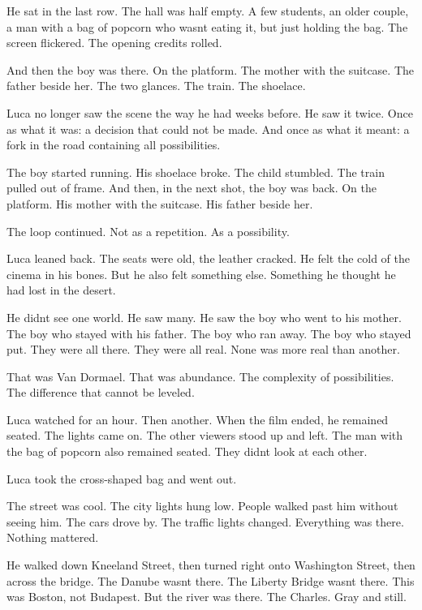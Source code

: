 \documentclass[
  ngerman,
]{article}
\begin{document}
He sat in the last row. The hall was half empty. A few students, an
older couple, a man with a bag of popcorn who wasn\textquotesingle t
eating it, but just holding the bag. The screen flickered. The opening
credits rolled.

And then the boy was there. On the platform. The mother with the
suitcase. The father beside her. The two glances. The train. The
shoelace.

Luca no longer saw the scene the way he had weeks before. He saw it
twice. Once as what it was: a decision that could not be made. And once
as what it meant: a fork in the road containing all possibilities.

The boy started running. His shoelace broke. The child stumbled. The
train pulled out of frame. And then, in the next shot, the boy was back.
On the platform. His mother with the suitcase. His father beside her.

The loop continued. Not as a repetition. As a possibility.

Luca leaned back. The seats were old, the leather cracked. He felt the
cold of the cinema in his bones. But he also felt something else.
Something he thought he had lost in the desert.

He didn\textquotesingle t see one world. He saw many. He saw the boy who
went to his mother. The boy who stayed with his father. The boy who ran
away. The boy who stayed put. They were all there. They were all real.
None was more real than another.

That was Van Dormael. That was abundance. The complexity of
possibilities. The difference that cannot be leveled.

Luca watched for an hour. Then another. When the film ended, he remained
seated. The lights came on. The other viewers stood up and left. The man
with the bag of popcorn also remained seated. They
didn\textquotesingle t look at each other.

Luca took the cross-shaped bag and went out.

The street was cool. The city lights hung low. People walked past him
without seeing him. The cars drove by. The traffic lights changed.
Everything was there. Nothing mattered.

He walked down Kneeland Street, then turned right onto Washington
Street, then across the bridge. The Danube wasn\textquotesingle t there.
The Liberty Bridge wasn\textquotesingle t there. This was Boston, not
Budapest. But the river was there. The Charles. Gray and still.
\end{document}
